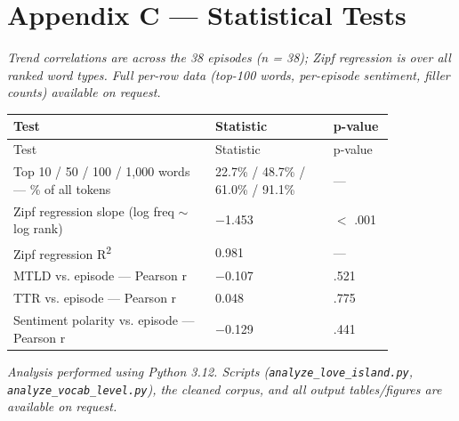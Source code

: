 \documentclass[11pt]{article}
\begin{document}
\section*{Appendix C --- Statistical Tests}

\emph{Trend correlations are across the 38 episodes (n = 38); Zipf regression is over all ranked word types. Full per-row data (top-100 words, per-episode sentiment, filler counts) available on request.}

\begin{longtable}{p{0.534\linewidth}p{0.316\linewidth}l}
\toprule
Test & Statistic & p-value \\
\midrule
\endfirsthead
\toprule
Test & Statistic & p-value \\
\midrule
\endhead
\bottomrule
\endlastfoot
Top 10 / 50 / 100 / 1,000 words --- \% of all tokens & 22.7\% / 48.7\% / 61.0\% / 91.1\% & --- \\
Zipf regression slope (log freq $\sim$ log rank) & $-$1.453 & $<$ .001 \\
Zipf regression R\textsuperscript{2} & 0.981 & --- \\
MTLD vs. episode --- Pearson r & $-$0.107 & .521 \\
TTR vs. episode --- Pearson r & 0.048 & .775 \\
Sentiment polarity vs. episode --- Pearson r & $-$0.129 & .441 \\
\end{longtable}


\emph{Analysis performed using Python 3.12. Scripts (\texttt{analyze\_love\_island.py}, \texttt{analyze\_vocab\_level.py}), the cleaned corpus, and all output tables/figures are available on request.}
\end{document}
